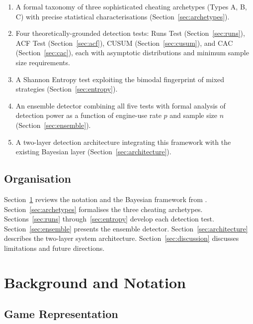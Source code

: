 \documentclass[11pt,a4paper]{article}
\begin{document}
\begin{enumerate}[label=(\roman*)]
\item A formal taxonomy of three sophisticated cheating archetypes
  (Types A, B, C) with precise statistical characterisations
  (Section~\ref{sec:archetypes}).

\item Four theoretically-grounded detection tests: Runs Test
  (Section~\ref{sec:runs}), ACF Test (Section~\ref{sec:acf}),
  CUSUM (Section~\ref{sec:cusum}), and CAC (Section~\ref{sec:cac}),
  each with asymptotic distributions and minimum sample size requirements.

\item A Shannon Entropy test exploiting the bimodal fingerprint of
  mixed strategies (Section~\ref{sec:entropy}).

\item An ensemble detector combining all five tests with formal analysis
  of detection power as a function of engine-use rate $p$ and sample
  size $n$ (Section~\ref{sec:ensemble}).

\item A two-layer detection architecture integrating this framework
  with the existing Bayesian layer (Section~\ref{sec:architecture}).
\end{enumerate}

\subsection{Organisation}

Section~\ref{sec:background} reviews the notation and the Bayesian
framework from \citet{nguyen2025bayesian}. Section~\ref{sec:archetypes}
formalises the three cheating archetypes. Sections~\ref{sec:runs}
through~\ref{sec:entropy} develop each detection test. Section~\ref{sec:ensemble}
presents the ensemble detector. Section~\ref{sec:architecture} describes
the two-layer system architecture. Section~\ref{sec:discussion} discusses
limitations and future directions.

\section{Background and Notation}
\label{sec:background}

\subsection{Game Representation}
\end{document}
